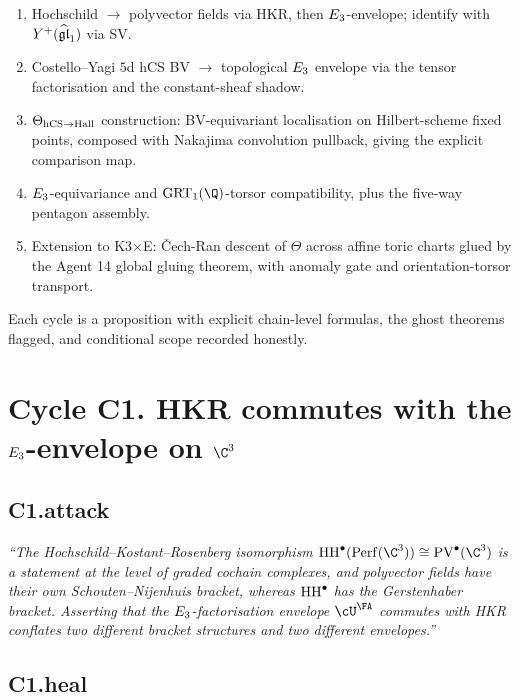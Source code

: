 \begin{enumerate}
\item[(C1)] Hochschild $\to$ polyvector fields via HKR, then
$E_3$-envelope; identify with $Y^+(\widehat{\mathfrak{gl}}_1)$ via SV.
\item[(C2)] Costello--Yagi $5$d hCS BV $\to$ topological $E_3$
envelope via the tensor factorisation and the constant-sheaf shadow.
\item[(C3)] $\Theta_{\mathrm{hCS}\to\mathrm{Hall}}$ construction: BV-equivariant
localisation on Hilbert-scheme fixed points, composed with Nakajima
convolution pullback, giving the explicit comparison map.
\item[(C4)] $E_3$-equivariance and $\GRT_1(\Q)$-torsor
compatibility, plus the five-way pentagon assembly.
\item[(C5)] Extension to K3$\times$E: \v{C}ech-Ran descent of
$\Theta$ across affine toric charts glued by the Agent 14 global
gluing theorem, with anomaly gate and orientation-torsor transport.
\end{enumerate}

Each cycle is a proposition with explicit chain-level formulas, the
ghost theorems flagged, and conditional scope recorded honestly.

\section*{Cycle C1. HKR commutes with the $E_3$-envelope on $\C^3$}

\subsection*{C1.attack}

\emph{``The Hochschild--Kostant--Rosenberg isomorphism
$\HH^\bullet(\Perf(\C^3)) \cong \PV^\bullet(\C^3)$ is a statement at
the level of graded cochain complexes, and polyvector fields have their
own Schouten--Nijenhuis bracket, whereas $\mathrm{HH}^\bullet$ has the
Gerstenhaber bracket. Asserting that the $E_3$-factorisation envelope
$\cU^\FA$ commutes with HKR conflates two different bracket structures
and two different envelopes.''}

\subsection*{C1.heal}

